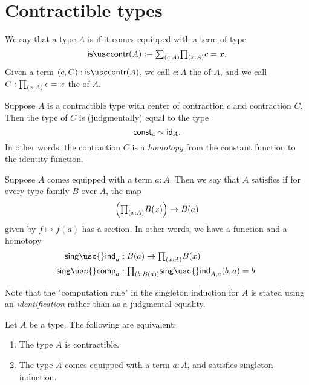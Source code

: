 \section{Contractible types}

\begin{defn}
  We say that a type $A$ is  if it comes equipped with a term of type
  \begin{equation*}
    \iscontr(A) \defeq \sm{c:A}\prd{x:A}c=x.
  \end{equation*}
  Given a term $(c,C):\iscontr(A)$, we call $c:A$ the  of $A$, and we call $C:\prd{x:A}c=x$ the  of $A$.
\end{defn}

\begin{rmk}
Suppose $A$ is a contractible type with center of contraction $c$ and contraction $C$. Then the type of $C$ is (judgmentally) equal to the type
\begin{equation*}
\mathsf{const}_c\htpy\idfunc[A].
\end{equation*}
In other words, the contraction $C$ is a \emph{homotopy} from the constant function to the identity function.
\end{rmk}

\begin{defn}
  Suppose $A$ comes equipped with a term $a:A$. Then we say that $A$ satisfies  if for every type family $B$ over $A$, the map
\begin{equation*}
\Big(\prd{x:A}B(x)\Big)\to B(a)
\end{equation*}
given by $f\mapsto f(a)$ has a section. In other words, we have a function and a homotopy
\begin{align*}
\mathsf{sing\usc{}ind}_{a} & : B(a)\to \prd{x:A}B(x) \\
\mathsf{sing\usc{}comp}_{a} & : \prd{b:B(a)} \mathsf{sing\usc{}ind}_{A,a}(b,a)=b.
\end{align*}
\end{defn}

\begin{rmk}
  Note that the "computation rule" in the singleton induction for $A$ is stated using an \emph{identification} rather than as a judgmental equality. 
\end{rmk}

\begin{thm}\label{thm:contractible}
Let $A$ be a type. The following are equivalent:
\begin{enumerate}
\item The type $A$ is contractible.
\item The type $A$ comes equipped with a term $a:A$, and satisfies singleton induction.
\end{enumerate}
\end{thm}

